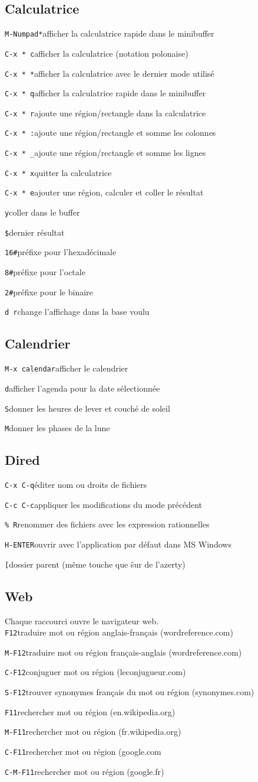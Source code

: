 \documentclass[10pt,landscape]{article}
\def\cm#1#2{{\tt#1}\dotfill#2\par}
\begin{document}
\begin{multicols}{3}
\subsection{Calculatrice}
\cm{M-Numpad*}{afficher la calculatrice rapide dans le minibuffer}
\cm{C-x * c}{afficher la calculatrice (notation polonaise)}
\cm{C-x * *}{afficher la calculatrice avec le dernier mode utilisé}
\cm{C-x * q}{afficher la calculatrice rapide dans le minibuffer}
\cm{C-x * r}{ajoute une région/rectangle dans la calculatrice}
\cm{C-x * :}{ajoute une région/rectangle et somme les colonnes}
\cm{C-x * \_}{ajoute une région/rectangle et somme les lignes}
\cm{C-x * x}{quitter la calculatrice}
\cm{C-x * e}{ajouter une région, calculer et coller le résultat}
\cm{y}{coller dans le buffer}
\cm{\$}{dernier résultat}
\cm{16\#}{préfixe pour l'hexadécimale}
\cm{8\#}{préfixe pour l'octale}
\cm{2\#}{préfixe pour le binaire}
\cm{d r}{change l'affichage dans la base voulu}





\subsection{Calendrier}
\cm{M-x calendar}{afficher le calendrier}
\cm{d}{afficher l'agenda pour la date sélectionnée}
\cm{S}{donner les heures de lever et couché de soleil}
\cm{M}{donner les phases de la lune}





\subsection{Dired}
\cm{C-x C-q}{éditer nom ou droits de fichiers}
\cm{C-c C-c}{appliquer les modifications du mode précédent}
\cm{\% R}{renommer des fichiers avec les expression rationnelles}
\cm{H-ENTER}{ouvrir avec l'application par défaut dans MS Windows}
\cm{[}{dossier parent (même touche que \^ sur de l'azerty)}





\subsection{Web}
Chaque raccourci ouvre le navigateur web.\\
\cm{F12}{traduire mot ou région anglais-français (wordreference.com)}
\cm{M-F12}{traduire mot ou région français-anglais (wordreference.com)}
\cm{C-F12}{conjuguer mot ou région (leconjugueur.com)}
\cm{S-F12}{trouver synonymes français du mot ou région (synonymes.com)}
\cm{F11}{rechercher mot ou région (en.wikipedia.org)}
\cm{M-F11}{rechercher mot ou région (fr.wikipedia.org)}
\cm{C-F11}{rechercher mot ou région (google.com}
\cm{C-M-F11}{rechercher mot ou région (google.fr)}




\end{multicols}
\end{document}

